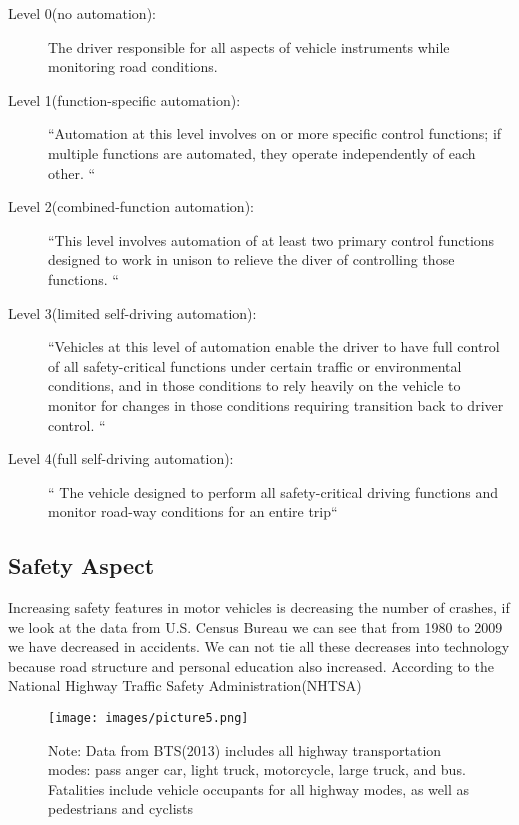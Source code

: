 \documentclass[sigconf]{acmart}
\begin{document}
\begin{description}
    \item[Level 0(no automation):] The driver responsible for all aspects of vehicle instruments while monitoring road conditions.\cite{hamzah}
    \item[Level 1(function-specific automation):] ``Automation at this level involves on or more specific control functions; if multiple functions are automated, they operate independently of each other. ``\cite{hamzah}
    \item[Level 2(combined-function automation):] ``This level involves automation of at least two primary control functions designed to work in unison to relieve the diver of controlling those functions. ``\cite{hamzah}
    \item[Level 3(limited self-driving automation):] ``Vehicles at this level of automation enable the driver to have full control of all safety-critical functions under certain traffic or environmental conditions, and in those conditions to rely heavily on the vehicle to monitor for changes in those conditions requiring transition back to driver control. ``\cite{hamzah}
    \item[Level 4(full self-driving automation):] `` The vehicle designed to perform all safety-critical driving functions and monitor road-way conditions for an entire trip``\cite{hamzah}
\end{description}

\subsection{Safety Aspect}
Increasing safety features in motor vehicles is decreasing the number of crashes, if we look at the data from U.S. Census Bureau we can see that from 1980 to 2009 we have decreased in accidents. We can not tie all these decreases into technology because road structure and personal education also increased. According to the National Highway Traffic Safety Administration(NHTSA)
 
 \begin{figure}[!ht]
  \centering
      \texttt{[image: images/picture5.png]}
  \caption{Note: Data from BTS(2013) includes all highway transportation modes: pass anger car, light truck, motorcycle, large truck, and bus. Fatalities include vehicle occupants for all highway modes, as well as pedestrians and cyclists}\label{fig:NHTSAaccidentreport}
\end{figure}
\end{document}
